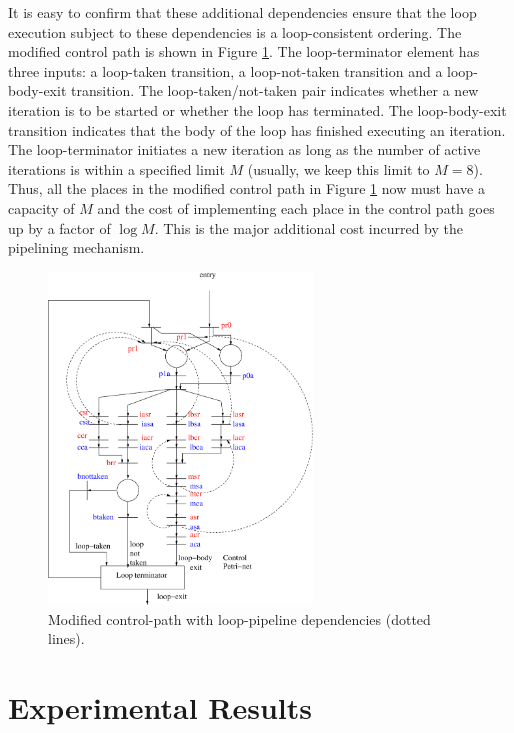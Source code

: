 \documentclass[conference]{IEEEtran}
\begin{document}
It is easy to confirm that these additional dependencies ensure
that the loop execution subject to these dependencies is a
loop-consistent ordering.  
The modified control path is shown in Figure \ref{fig:pipelinedCP}.
The loop-terminator element has three inputs:  a loop-taken transition,
a loop-not-taken transition and a loop-body-exit transition.  The loop-taken/not-taken
pair indicates whether a new iteration is to be started or whether the 
loop has terminated.  The loop-body-exit
transition indicates that the body of the loop has finished executing an
iteration.  The loop-terminator initiates a new iteration as long as the
number of active iterations is within a specified limit $M$ (usually, we keep
this limit to $M=8$).  Thus, all the places in the modified control path
in Figure \ref{fig:pipelinedCP} now must have a capacity of $M$ and the
cost of implementing each place in the control path goes up by a
factor of $\log M$.  This is the major additional cost incurred by
the pipelining mechanism.
\begin{figure}[ht]
  \centering
  \includegraphics[width=7cm]{pipelinedCP.eps}
  \caption{Modified control-path with loop-pipeline dependencies (dotted lines).}
  \label{fig:pipelinedCP}
\end{figure}

\section{Experimental Results}
\end{document}

